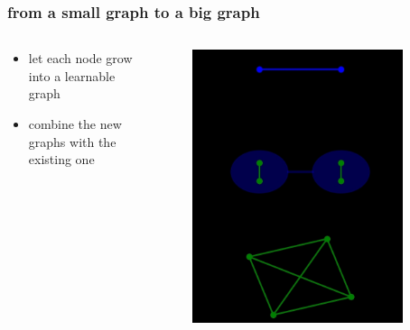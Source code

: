 \documentclass[hyperref={pdfpagelabels=false}]{beamer}
\begin{document}
\begin{frame}[label=from a small graph to a big graph]
\frametitle{from a small graph to a big graph}
\begin{columns}[c] %
\begin{column}{0.48\textwidth}%
\begin{itemize}

    \item let each node grow into a learnable graph

    \item combine the new graphs with the existing one


\end{itemize}
\end{column}%
\hfill%
\begin{column}{0.48\textwidth}%
\begin{figure}[H] 
  \centering
\includegraphics[width=0.9\textwidth]{../imgs/abibb}
\label{fig:abibb}
  \end{figure}


\end{column}%
\hfill%
\end{columns}

\end{frame}
\end{document}

